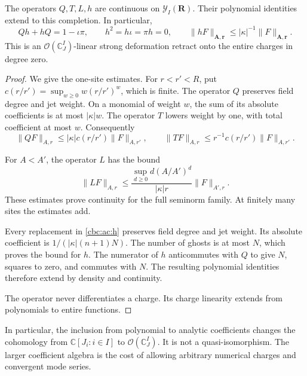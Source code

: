 \begin{proposition}\label{cbc:ac:continuous-contraction}
The operators $Q,T,L,h$ are continuous on
$\mathcal Y_I(\mathbf R)$. Their polynomial identities extend
to this completion. In particular,
\[
 Qh+hQ=1-\iota\pi,\qquad
 h^2=h\iota=\pi h=0,\qquad
 \|hF\|_{\mathbf A,\mathbf r}
              \leq|\kappa|^{-1}\|F\|_{\mathbf A,\mathbf r}.
\]
This is an $\mathcal O(\mathbb C^I_J)$-linear strong
deformation retract onto the entire charges in degree zero.
\end{proposition}
\begin{proof}
We give the one-site estimates. For $r<r'<R$, put
$c(r/r')=\sup_{w\geq0}w(r/r')^w$, which is finite.
The operator $Q$ preserves field degree and jet weight.
On a monomial of weight $w$, the sum of its absolute
coefficients is at most $|\kappa|w$. The operator $T$
lowers weight by one, with total coefficient at most $w$.
Consequently
\[
 \|QF\|_{A,r}\leq|\kappa|c(r/r')\|F\|_{A,r'},\qquad
 \|TF\|_{A,r}\leq r^{-1}c(r/r')\|F\|_{A,r'}.
\]

For $A<A'$, the operator $L$ has the bound
\[
 \|LF\|_{A,r}\leq
   \frac{\sup_{d\geq0}d(A/A')^d}{|\kappa|r}
                            \|F\|_{A',r}.
\]
These estimates prove continuity for the full seminorm family.
At finitely many sites the estimates add.

Every replacement in \eqref{cbc:ac:h} preserves field degree
and jet weight. Its absolute coefficient is
$1/(|\kappa|(n+1)N)$. The number of ghosts is at most $N$,
which proves the bound for $h$. The numerator of $h$
anticommutes with $Q$ to give $N$, squares to zero, and
commutes with $N$. The resulting polynomial identities
therefore extend by density and continuity.

The operator never differentiates a charge. Its charge
linearity extends from polynomials to entire functions.
\end{proof}

In particular, the inclusion from polynomial to analytic
coefficients changes the cohomology from
$\mathbb C[J_i:i\in I]$ to $\mathcal O(\mathbb C^I_J)$.
It is not a quasi-isomorphism. The larger coefficient algebra
is the cost of allowing arbitrary numerical charges and
convergent mode series.

